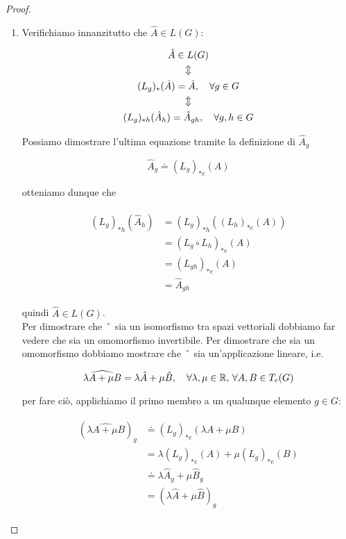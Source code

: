 \begin{proof}
	\begin{enumerate}
		\item Verifichiamo innanzitutto che $ \hat{A} \in L(G) $:
		
		\begin{gather}
			\hat{A} \in L(G) \nonumber \\
			\Updownarrow \nonumber \\
			(L_{g})_{*}(\hat{A}) = \hat{A} \qcomma \forall g \in G \\
			\Updownarrow \nonumber \\
			(L_{g})_{*h}(\hat{A}_{h}) = \hat{A}_{gh} \qcomma \forall g,h \in G \nonumber
		\end{gather}
	
		Possiamo dimostrare l'ultima equazione tramite la definizione di $ \hat{A}_{g} $
		
		\begin{equation}
			\hat{A}_{g} \doteq (L_{g})_{*e}(A)
		\end{equation}
	
		otteniamo dunque che
		
		\begin{align}
			\begin{split}
				(L_{g})_{*h}(\hat{A}_{h}) &= (L_{g})_{*h}((L_{h})_{*e}(A)) \\
				&= (L_{g} \circ L_{h})_{*e} (A) \\
				&= (L_{gh})_{*e} (A) \\
				&= \hat{A}_{gh}
			\end{split}
		\end{align}
		
		quindi $ \hat{A} \in L(G) $.\\
		Per dimostrare che $ \; \hat{} \; $ sia un isomorfismo tra spazi vettoriali dobbiamo far vedere che sia un omomorfismo invertibile. Per dimostrare che sia un omomorfismo dobbiamo mostrare che $ \; \hat{} \; $ sia un'applicazione lineare, i.e.
		
		\begin{equation}
			\widehat{\lambda A + \mu B} = \lambda \hat{A} + \mu \hat{B} %
			 \qcomma \forall \lambda,\mu \in \R, \, \forall A,B \in T_{e}(G)
		\end{equation}
	
		per fare ciò, applichiamo il primo membro a un qualunque elemento $ g \in G $:
	
		\begin{align}
			\begin{split}
				(\widehat{\lambda A + \mu B})_{g} &\doteq (L_{g})_{*e} (\lambda A + \mu B) \\
				&= \lambda (L_{g})_{*e} (A) + \mu (L_{g})_{*e} (B) \\
				&\doteq \lambda \hat{A}_{g} + \mu \hat{B}_{g} \\
				&= (\lambda \hat{A} + \mu \hat{B})_{g}
			\end{split}
		\end{align}
	

\end{enumerate}
\end{proof}
